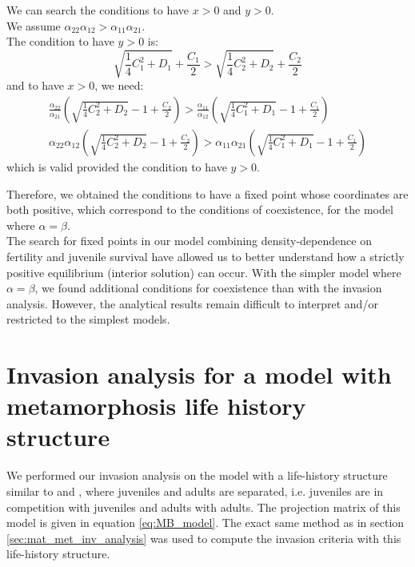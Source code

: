 \documentclass{article}
\begin{document}
We can search the conditions to have $x>0$ and $y>0$.\\
We assume $\alpha_{22}\alpha_{12}>\alpha_{11}\alpha_{21}$.\\
The condition to have $y>0$ is:
\begin{equation}
    \sqrt{\frac{1}{4}C_1^2+D_1}+\frac{C_1}{2}>\sqrt{\frac{1}{4}C_2^2+D_2}+\frac{C_2}{2}
\end{equation}
and to have $x>0$, we need:
\begin{align}
    \frac{\alpha_{22}}{\alpha_{21}}\left(\sqrt{\frac{1}{4}C_2^2+D_2}-1 + \frac{C_2}{2}\right)>\frac{\alpha_{11}}{\alpha_{12}}\left(\sqrt{\frac{1}{4}C_1^2+D_1}-1 + \frac{C_1}{2}\right)\\
    \alpha_{22}\alpha_{12}\left(\sqrt{\frac{1}{4}C_2^2+D_2}-1 + \frac{C_2}{2}\right) > \alpha_{11}\alpha_{21}\left(\sqrt{\frac{1}{4}C_1^2+D_1}-1 + \frac{C_1}{2}\right)
\end{align}
which is valid provided the condition to have $y>0$.

Therefore, we obtained the conditions to have a fixed point whose coordinates are both positive, which correspond to the conditions of coexistence, for the model where $\alpha = \beta$.\\

The search for fixed points in our model combining density-dependence on fertility and juvenile survival have allowed us to better understand how a strictly positive equilibrium (interior solution) can occur. With the simpler model where $\alpha=\beta$, we found additional conditions for coexistence than with the invasion analysis.
However, the analytical results remain difficult to interpret and/or restricted to the simplest models.


\newpage

\section{Invasion analysis for a model with metamorphosis life history structure}\label{SI:inv_analysis_MB}

We performed our invasion analysis on the model with a life-history structure similar to  \citet{moll2008competition} and \citet{cushing2007coexistence}, where juveniles and adults are separated, i.e. juveniles are in competition with juveniles and adults with adults. The projection matrix of this model is given in equation \eqref{eq:MB_model}.
The exact same method as in section \ref{sec:mat_met_inv_analysis} was used to compute the invasion criteria with this life-history structure.
\end{document}
